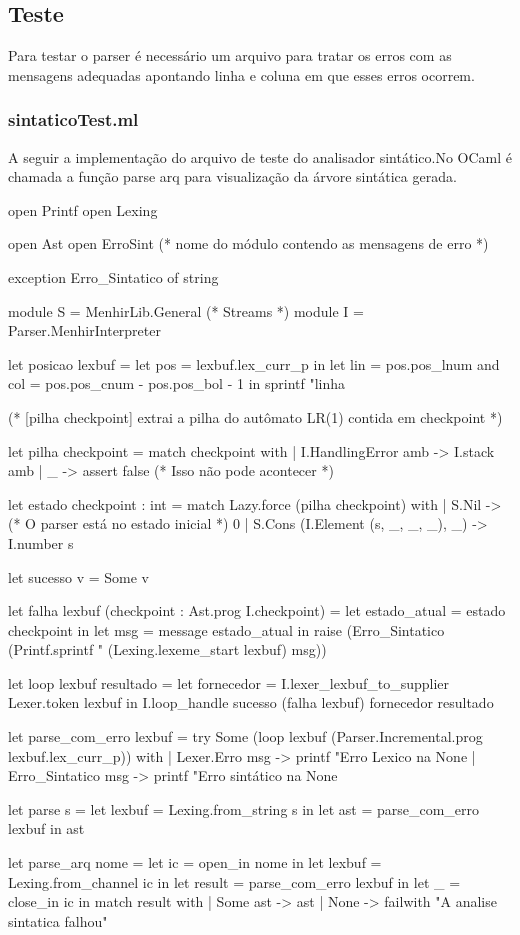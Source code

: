 \documentclass[12pt,a4paper,twoside]{report}
\begin{document}
\subsection{Teste}
Para testar o parser é necessário um arquivo para tratar os erros com as mensagens adequadas apontando linha e coluna em que esses erros ocorrem.
\subsubsection{sintaticoTest.ml}
A seguir a implementação do arquivo de teste do analisador sintático.No OCaml é chamada a função parse arq para visualização da árvore sintática gerada.
\begin{terminal}
open Printf
open Lexing

open Ast
open ErroSint (* nome do módulo contendo as mensagens de erro *)

exception Erro_Sintatico of string
    
module S = MenhirLib.General (* Streams *)
module I = Parser.MenhirInterpreter

let posicao lexbuf =
    let pos = lexbuf.lex_curr_p in
    let lin = pos.pos_lnum
    and col = pos.pos_cnum - pos.pos_bol - 1 in
    sprintf "linha %

(* [pilha checkpoint] extrai a pilha do autômato LR(1) contida em checkpoint *)

let pilha checkpoint =
  match checkpoint with
  | I.HandlingError amb -> I.stack amb
  | _ -> assert false (* Isso não pode acontecer *)

let estado checkpoint : int =
  match Lazy.force (pilha checkpoint) with
  | S.Nil -> (* O parser está no estado inicial *)
     0
  | S.Cons (I.Element (s, _, _, _), _) ->
     I.number s

let sucesso v = Some v

let falha lexbuf (checkpoint : Ast.prog I.checkpoint) =
  let estado_atual = estado checkpoint in
  let msg = message estado_atual in
  raise (Erro_Sintatico (Printf.sprintf "%
                                      (Lexing.lexeme_start lexbuf) msg))

let loop lexbuf resultado =
  let fornecedor = I.lexer_lexbuf_to_supplier Lexer.token lexbuf in
  I.loop_handle sucesso (falha lexbuf) fornecedor resultado


let parse_com_erro lexbuf =
  try
    Some (loop lexbuf (Parser.Incremental.prog lexbuf.lex_curr_p))
  with
  | Lexer.Erro msg ->
     printf "Erro Lexico na %
     None
  | Erro_Sintatico msg ->
     printf "Erro sintático na %
     None

let parse s =
  let lexbuf = Lexing.from_string s in
  let ast = parse_com_erro lexbuf in
  ast

let parse_arq nome =
  let ic = open_in nome in
  let lexbuf = Lexing.from_channel ic in
  let result = parse_com_erro lexbuf in
  let _ = close_in ic in
  match result with
  | Some ast -> ast
  | None -> failwith "A analise sintatica falhou"


\end{terminal}
\end{document}
